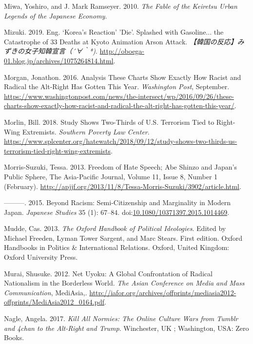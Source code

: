 \documentclass[10pt,british,A4paper,,openany]{memoir}
\begin{document}
\hypertarget{ref-miwa_fable_2010}{}
Miwa, Yoshiro, and J. Mark Ramseyer. 2010. \emph{The Fable of the
Keiretsu Urban Legends of the Japanese Economy}.

\hypertarget{ref-mizuki_eng._2019}{}
Mizuki. 2019. Eng. `Korea's Reaction' 'Die'. Splashed with Gasoline...
the Catastrophe of 33 Deaths at Kyoto Animation Arson Attack.
\emph{【韓国の反応】みずきの女子知韓宣言（´∀｀*)}.
\url{http://oboega-01.blog.jp/archives/1075264814.html}.

\hypertarget{ref-morgan_analysis_2016}{}
Morgan, Jonathon. 2016. Analysis These Charts Show Exactly How Racist
and Radical the Alt-Right Has Gotten This Year. \emph{Washington Post},
September.
\url{https://www.washingtonpost.com/news/the-intersect/wp/2016/09/26/these-charts-show-exactly-how-racist-and-radical-the-alt-right-has-gotten-this-year/}.

\hypertarget{ref-morlin_study_2018}{}
Morlin, Bill. 2018. Study Shows Two-Thirds of U.S. Terrorism Tied to
Right-Wing Extremists. \emph{Southern Poverty Law Center}.
\url{https://www.splcenter.org/hatewatch/2018/09/12/study-shows-two-thirds-us-terrorism-tied-right-wing-extremists}.

\hypertarget{ref-morris-suzuki_freedom_2013}{}
Morris-Suzuki, Tessa. 2013. Freedom of Hate Speech; Abe Shinzo and
Japan's Public Sphere, The Asia-Pacific Journal, Volume 11, Issue 8,
Number 1 (February).
\url{http://apjjf.org/2013/11/8/Tessa-Morris-Suzuki/3902/article.html}.

\hypertarget{ref-morris-suzuki_beyond_2015}{}
---------. 2015. Beyond Racism: Semi-Citizenship and Marginality in
Modern Japan. \emph{Japanese Studies} 35 (1): 67--84.
doi:\href{https://doi.org/10.1080/10371397.2015.1014469}{10.1080/10371397.2015.1014469}.

\hypertarget{ref-mudde_oxford_2013}{}
Mudde, Cas. 2013. \emph{The Oxford Handbook of Political Ideologies}.
Edited by Michael Freeden, Lyman Tower Sargent, and Marc Stears. First
edition. Oxford Handbooks in Politics \& International Relations.
Oxford, United Kingdom: Oxford University Press.

\hypertarget{ref-murai_net_2012}{}
Murai, Shusuke. 2012. Net Uyoku: A Global Confrontation of Radical
Nationalism in the Borderless World. \emph{The Asian Conference on Media
and Mass Communication}, MediAsia,.
\url{http://iafor.org/archives/offprints/mediasia2012-offprints/MediAsia2012_0164.pdf}.

\hypertarget{ref-nagle_kill_2017}{}
Nagle, Angela. 2017. \emph{Kill All Normies: The Online Culture Wars
from Tumblr and 4chan to the Alt-Right and Trump}. Winchester, UK ;
Washington, USA: Zero Books.
\end{document}
